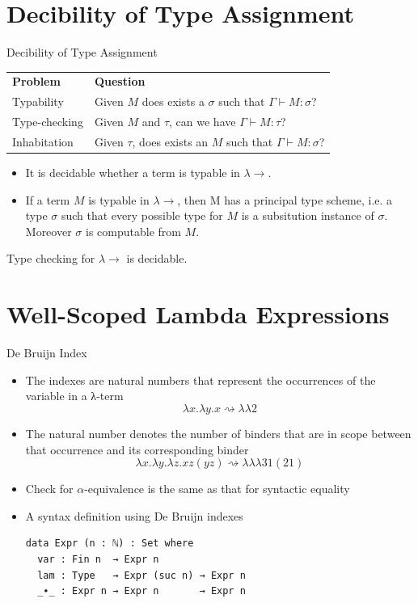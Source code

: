 \documentclass[10pt, xetex, hyperref={pdfpagelabels=false,breaklinks}]{beamer}
\begin{document}
\section{Decibility of Type Assignment}
\begin{frame}{Decibility of Type Assignment~\citep{barendregt2013lambda}}

\begin{tabular}{ll}
{\color{blu} \textbf{Problem}} & {\color{blu} \textbf{Question}} \\
{\color{blu} Typability}       & Given $M$ does exists a $σ$ such that $Γ ⊢ M : σ$? \\
{\color{blu} Type-checking}    & Given $M$ and $τ$, can we have $Γ ⊢ M : τ$?  \\
{\color{blu} Inhabitation}     & Given $τ$, does exists an $M$ such that $Γ ⊢ M : σ$?\\
\end{tabular}

\begin{theorem}%
\begin{itemize}
\item It is decidable whether a term is typable in $\lambda\rightarrow$.
\item If a term $M$ is typable in $\lambda\rightarrow$, then M has a principal type scheme, i.e.
a type $σ$ such that every possible type for $M$ is a subsitution instance of $σ$.
Moreover $σ$ is computable from $M$.
\end{itemize}
\end{theorem}

\begin{theorem}%
Type checking for $\lambda\rightarrow$ is decidable.
\end{theorem}

\end{frame}

\section{Well-Scoped Lambda Expressions}
\begin{frame}[fragile]{De Bruijn Index}
\begin{itemize}
\item The indexes are natural numbers that represent the occurrences of the variable in a λ-term
$$  λx. λy. x ⇝  λ λ 2$$
\item The natural number denotes the number of binders that are in scope between that occurrence and its corresponding binder
$$λx. λy. λz. x z (y z)  ⇝ λ λ λ 3 1 (2 1)$$
\item Check for $α$-equivalence is the same as that for syntactic equality
\item A syntax definition using De Bruijn indexes\\[3mm]
\begin{verbatim}
data Expr (n : ℕ) : Set where
  var : Fin n  → Expr n
  lam : Type   → Expr (suc n) → Expr n
  _∙_ : Expr n → Expr n       → Expr n
\end{verbatim}
\end{itemize}
\end{frame}
\end{document}
